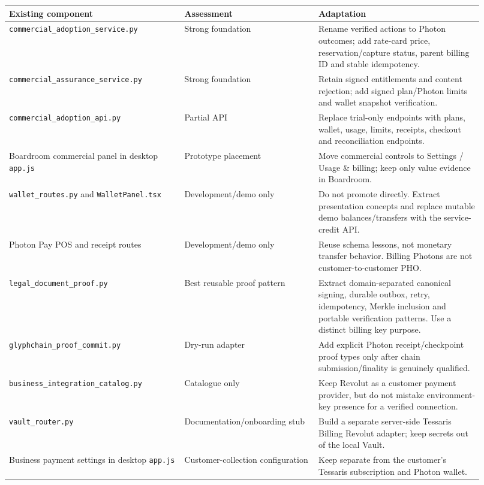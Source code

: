 \documentclass[11pt]{article}
\newcommand{\code}[1]{\texttt{#1}}
\begin{document}
\begin{longtable}{p{0.34\linewidth} p{0.26\linewidth} p{0.32\linewidth}}
\toprule
Existing component & Assessment & Adaptation \\
\midrule
\endhead
\code{commercial\_adoption\_service.py} & Strong foundation & Rename verified actions to Photon outcomes; add rate-card price, reservation/capture status, parent billing ID and stable idempotency. \\
\code{commercial\_assurance\_service.py} & Strong foundation & Retain signed entitlements and content rejection; add signed plan/Photon limits and wallet snapshot verification. \\
\code{commercial\_adoption\_api.py} & Partial API & Replace trial-only endpoints with plans, wallet, usage, limits, receipts, checkout and reconciliation endpoints. \\
Boardroom commercial panel in desktop \code{app.js} & Prototype placement & Move commercial controls to Settings / Usage \& billing; keep only value evidence in Boardroom. \\
\code{wallet\_routes.py} and \code{WalletPanel.tsx} & Development/demo only & Do not promote directly. Extract presentation concepts and replace mutable demo balances/transfers with the service-credit API. \\
Photon Pay POS and receipt routes & Development/demo only & Reuse schema lessons, not monetary transfer behavior. Billing Photons are not customer-to-customer PHO. \\
\code{legal\_document\_proof.py} & Best reusable proof pattern & Extract domain-separated canonical signing, durable outbox, retry, idempotency, Merkle inclusion and portable verification patterns. Use a distinct billing key purpose. \\
\code{glyphchain\_proof\_commit.py} & Dry-run adapter & Add explicit Photon receipt/checkpoint proof types only after chain submission/finality is genuinely qualified. \\
\code{business\_integration\_catalog.py} & Catalogue only & Keep Revolut as a customer payment provider, but do not mistake environment-key presence for a verified connection. \\
\code{vault\_router.py} & Documentation/onboarding stub & Build a separate server-side Tessaris Billing Revolut adapter; keep secrets out of the local Vault. \\
Business payment settings in desktop \code{app.js} & Customer-collection configuration & Keep separate from the customer's Tessaris subscription and Photon wallet. \\
\bottomrule
\end{longtable}
\end{document}
